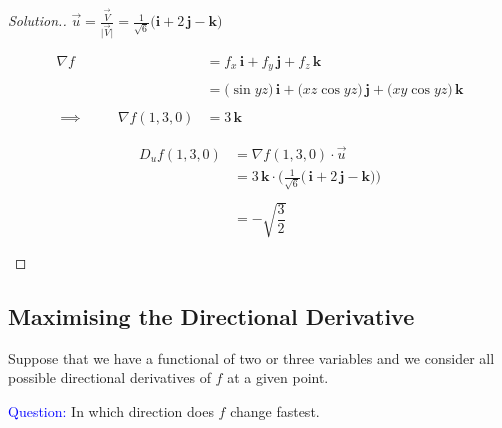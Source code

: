 \documentclass[11pt,a4paper]{article}
\theoremstyle{definition}
\newenvironment{solution}
  {\renewcommand{\qedsymbol}{}\begin{proof}[\textit{Solution}.]}
  {\end{proof}}
\begin{document}
\begin{solution}


$\displaystyle{\overrightarrow{u} = \frac{\overrightarrow{V}}{\big|\overrightarrow{V}\big|}=\frac{1}{\sqrt{6}}\big(\textbf{i} + 2\,\textbf{j} - \textbf{k}\big)}$

\begin{align*}
\nabla f & = f_x\,\textbf{i} + f_y\,\textbf{j} + f_z\,\textbf{k}\\\\
& = \big(\sin yz\big)\,\textbf{i} + \big( xz\cos yz\big)\,\textbf{j} + \big(xy\cos yz\big)\,\textbf{k}\\\\
\implies \hspace{1cm} \nabla f(1,3,0) & = 3\,\textbf{k} 
\end{align*}

\begin{align*}
D_u f(1,3,0) & = \nabla f(1,3,0)\cdot\overrightarrow{u}\\
& = 3\,\textbf{k}\cdot \Big(\frac{1}{\sqrt{6}}\big(\,\textbf{i} + 2\,\textbf{j} - \textbf{k}\big)\Big)\\\\
& = - \sqrt{\dfrac{3}{2}}\\\\
\end{align*}
\end{solution}

{\color[wave]{485}\subsection{Maximising the Directional Derivative}}
Suppose that we have a functional of two or three variables and we consider all possible directional derivatives of $f$ at a given point.


{\textcolor{blue}{Question:}} In which direction does $f$ change fastest.
\end{document}
